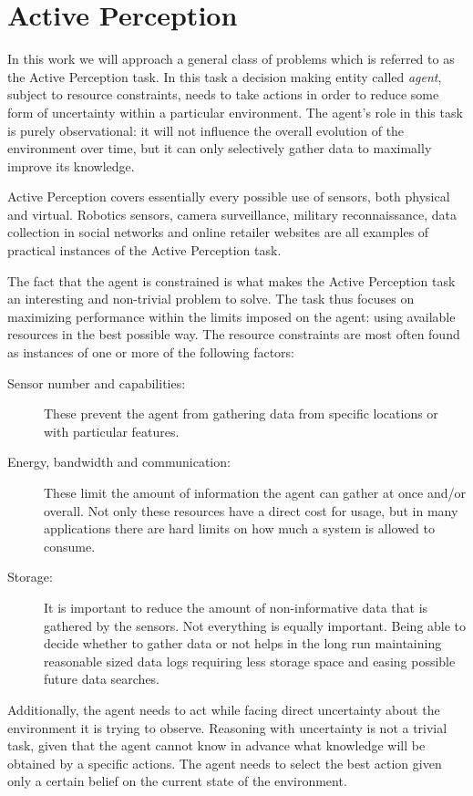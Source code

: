 \section{Active Perception}

In this work we will approach a general class of problems which is referred to as the Active
Perception task. In this task a decision making entity called \textit{agent}, subject to resource
constraints, needs to take actions in order to reduce some form of uncertainty within a particular
environment. The agent's role in this task is purely observational: it will not influence the
overall evolution of the environment over time, but it can only selectively gather data to maximally
improve its knowledge.

Active Perception covers essentially every possible use of sensors, both physical and virtual.
Robotics sensors, camera surveillance, military reconnaissance, data collection in social networks
and online retailer websites are all examples of practical instances of the Active Perception task.

The fact that the agent is constrained is what makes the Active Perception task an interesting and
non-trivial problem to solve. The task thus focuses on maximizing performance within the limits
imposed on the agent: using available resources in the best possible way. The resource constraints
are most often found as instances of one or more of the following factors:

\begin{description}
\item[Sensor number and capabilities:] These prevent the agent from gathering data from specific
    locations or with particular features.
\item[Energy, bandwidth and communication:] These limit the amount of information the agent can
    gather at once and/or overall. Not only these resources have a direct cost for usage, but in
    many applications there are hard limits on how much a system is allowed to consume.
\item[Storage:] It is important to reduce the amount of non-informative data that is gathered by the
    sensors. Not everything is equally important. Being able to decide whether to gather data or not
    helps in the long run maintaining reasonable sized data logs requiring less storage space and
    easing possible future data searches.
\end{description}

Additionally, the agent needs to act while facing direct uncertainty about the environment it is
trying to observe. Reasoning with uncertainty is not a trivial task, given that the agent cannot
know in advance what knowledge will be obtained by a specific actions. The agent needs to select the
best action given only a certain belief on the current state of the environment.


